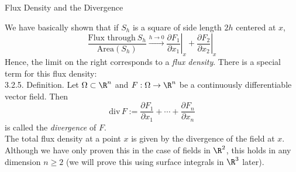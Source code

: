 \documentclass[smaller,hyperref={CJKbookmarks=true}]{beamer}
\begin{document}
\begin{frame}[t]{Flux Density and the Divergence}
\begin{spacing}{1}
We have basically shown that if $S_h$ is a square of side length $2h$ centered at $x$,
\[\frac{\text{Flux through}~S_h}{\text{Area}(S_h)}\xrightarrow[]{h\to0}
\left.\frac{\partial F_1}{\partial x_1}\right|_x+\left.\frac{\partial F_2}{\partial x_2}\right|_x\]
Hence, the limit on the right corresponds to a \emph{flux density}. There is a
special term for this flux density:\\[5pt]
\alert{3.2.5. Definition.} Let $\Omega\subset\R^n$ and $F:\Omega\to\R^n$ be a continuously dif{}ferentiable vector field. Then
\[\text{div}\,F:=\frac{\partial F_1}{\partial x_1}+\cdots+\frac{\partial F_n}{\partial x_n}\]
is called the \emph{divergence} of $F$.\\[5pt]
The total flux density at a point $x$ is given by the divergence of the field at
$x$. Although we have only proven this in the case of fields in $\R^2$, this holds
in any dimension $n\geq2$ (we will prove this using surface integrals in $\R^3$ later).
\end{spacing}
\end{frame}
\end{document}
